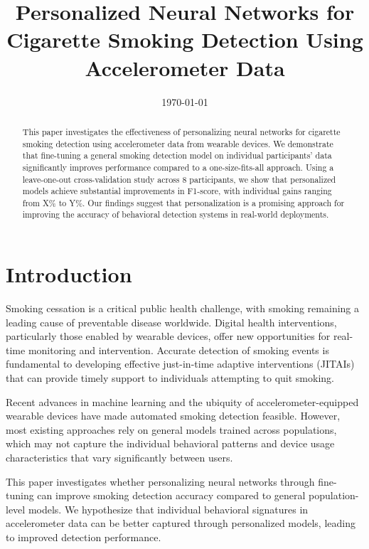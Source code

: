 \documentclass[11pt]{article}
\title{Personalized Neural Networks for Cigarette Smoking Detection Using Accelerometer Data}
\author{
}
\date{\today}
\begin{document}
\maketitle

\begin{abstract}
This paper investigates the effectiveness of personalizing neural networks for cigarette smoking detection using accelerometer data from wearable devices. We demonstrate that fine-tuning a general smoking detection model on individual participants' data significantly improves performance compared to a one-size-fits-all approach. Using a leave-one-out cross-validation study across 8 participants, we show that personalized models achieve substantial improvements in F1-score, with individual gains ranging from X\% to Y\%. Our findings suggest that personalization is a promising approach for improving the accuracy of behavioral detection systems in real-world deployments.
\end{abstract}

\section{Introduction}
\label{sec:introduction}


Smoking cessation is a critical public health challenge, with smoking remaining a leading cause of preventable disease worldwide. Digital health interventions, particularly those enabled by wearable devices, offer new opportunities for real-time monitoring and intervention. Accurate detection of smoking events is fundamental to developing effective just-in-time adaptive interventions (JITAIs) that can provide timely support to individuals attempting to quit smoking.

Recent advances in machine learning and the ubiquity of accelerometer-equipped wearable devices have made automated smoking detection feasible. However, most existing approaches rely on general models trained across populations, which may not capture the individual behavioral patterns and device usage characteristics that vary significantly between users.

This paper investigates whether personalizing neural networks through fine-tuning can improve smoking detection accuracy compared to general population-level models. We hypothesize that individual behavioral signatures in accelerometer data can be better captured through personalized models, leading to improved detection performance.
\end{document}
